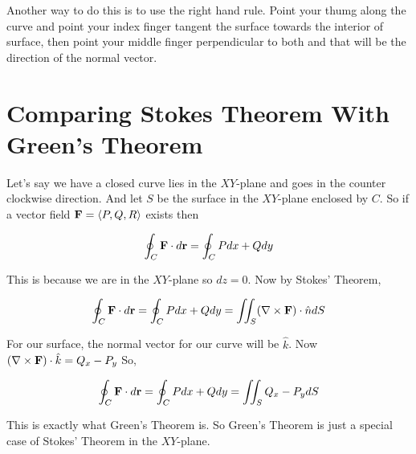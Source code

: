 Another way to do this is to use the right hand rule.
Point your thumg along the curve and point your index finger tangent the surface towards the interior of surface, 
then point your middle finger perpendicular to both and that will be the direction of the normal vector. 


\section{Comparing Stokes Theorem With Green's Theorem}

Let's say we have a closed curve lies in the $XY$-plane and goes in the counter clockwise direction.
And let $S$ be the surface in the $XY$-plane enclosed by $C$.
So if a vector field ${\bf F} = \left< P, Q, R \right>$ exists then 

$$ \oint_C {\bf F} \cdot d{\bf r} = \oint_C Pdx + Qdy $$

This is because we are in the $XY$-plane so $dz = 0$.
Now by Stokes' Theorem, 

$$ 
\oint_C {\bf F} \cdot d{\bf r} 
= \oint_C Pdx + Qdy 
= \iint_S (\nabla \times {\bf F}) \cdot \hat{n} dS 
$$

For our surface, the normal vector for our curve  will be $\hat{k}$. Now $(\nabla \times {\bf F}) \cdot \hat{k} = Q_x - P_y$
So, 

$$
\oint_C {\bf F} \cdot d{\bf r} 
= \oint_C Pdx + Qdy 
= \iint_S Q_x - P_y dS 
$$

This is exactly what Green's Theorem is. 
So Green's Theorem is just a special case of Stokes' Theorem in the $XY$-plane.

